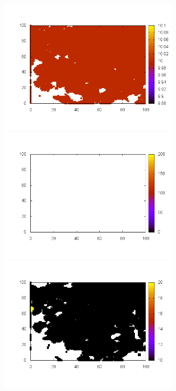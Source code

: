 \documentclass[10pt,a4paper]{article}
\begin{document}
\begin{figure}
\begin{subfigure}[b]{1\textwidth}
\includegraphics[scale=.3]{./img/SCC_Stable3/cut90p/18.png}
\includegraphics[scale=.3]{./img/SCC_Stable3/cut90p/19.png}
\includegraphics[scale=.3]{./img/SCC_Stable3/cut90p/20.png}

\end{subfigure}
\end{figure}
\end{document}
